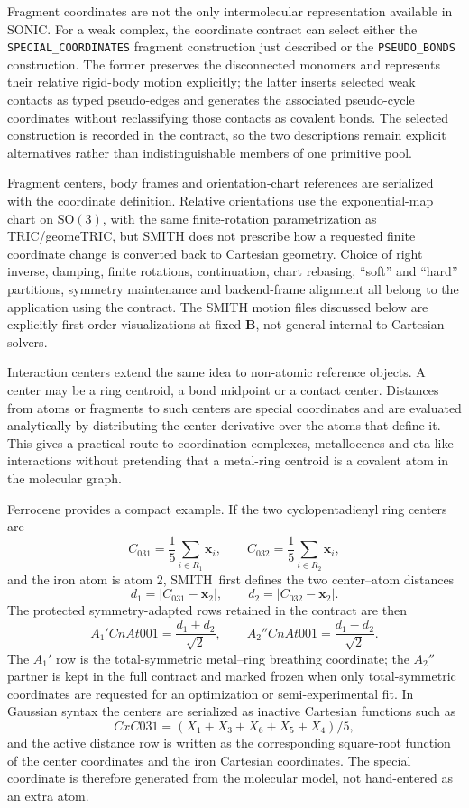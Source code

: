 \documentclass[journal=jctcce,manuscript=article,layout=traditional]{achemso}
\newcommand{\SONIC}{SONIC}
\newcommand{\SMITH}{\textsc{SMITH}}
\newcommand{\Bmat}{\mathbf{B}}
\theoremstyle{definition}
\begin{document}
Fragment coordinates are not the only intermolecular representation available
in \SONIC.  For a weak complex, the coordinate contract can select either the
\texttt{SPECIAL\_COORDINATES} fragment construction just described or the
\texttt{PSEUDO\_BONDS} construction.  The former preserves the disconnected
monomers and represents their relative rigid-body motion explicitly; the latter
inserts selected weak contacts as typed pseudo-edges and generates the
associated pseudo-cycle coordinates without reclassifying those contacts as
covalent bonds.  The selected construction is recorded in the contract, so the
two descriptions remain explicit alternatives rather than indistinguishable
members of one primitive pool.

Fragment centers, body frames and orientation-chart references are serialized
with the coordinate definition.  Relative orientations use the exponential-map
chart on \(\mathrm{SO}(3)\), with the same finite-rotation parametrization as
TRIC/geomeTRIC, but SMITH does not prescribe how a requested finite coordinate
change is converted back to Cartesian geometry.  Choice of right inverse,
damping, finite rotations, continuation, chart rebasing, ``soft'' and ``hard''
partitions, symmetry maintenance and backend-frame alignment all belong to the
application using the contract.  The SMITH motion files discussed below are
explicitly first-order visualizations at fixed \(\Bmat\), not general
internal-to-Cartesian solvers.

Interaction centers extend the same idea to non-atomic reference objects.  A
center may be a ring centroid, a bond midpoint or a contact center.  Distances
from atoms or fragments to such centers are special coordinates and
are evaluated analytically by distributing the center derivative over the atoms
that define it.  This gives a practical route to coordination complexes,
metallocenes and eta-like interactions without pretending that a metal-ring
centroid is a covalent atom in the molecular graph.

Ferrocene provides a compact example.  If the two cyclopentadienyl ring
centers are
\[
 C_{031}=\frac{1}{5}\sum_{i\in R_1}\mathbf{x}_i,\qquad
 C_{032}=\frac{1}{5}\sum_{i\in R_2}\mathbf{x}_i,
\]
and the iron atom is atom 2, \SMITH\ first defines the two center--atom
distances
\[
 d_1=|C_{031}-\mathbf{x}_2|,\qquad d_2=|C_{032}-\mathbf{x}_2|.
\]
The protected symmetry-adapted rows retained in the contract are then
\[
 A_1'CnAt001=\frac{d_1+d_2}{\sqrt2},\qquad
 A_2''CnAt001=\frac{d_1-d_2}{\sqrt2}.
\]
The \(A_1'\) row is the total-symmetric metal--ring breathing coordinate; the
\(A_2''\) partner is kept in the full contract and marked frozen when only
total-symmetric coordinates are requested for an optimization or
semi-experimental fit.  In Gaussian syntax the centers are serialized as
inactive Cartesian functions such as
\[
 CxC031=(X_1+X_3+X_6+X_5+X_4)/5,
\]
and the active distance row is written as the corresponding square-root
function of the center coordinates and the iron Cartesian coordinates.  The
special coordinate is therefore generated from the molecular model, not
hand-entered as an extra atom.
\end{document}

